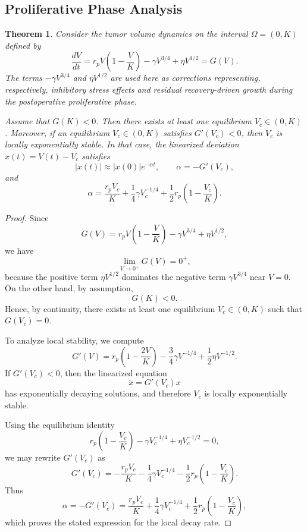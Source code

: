 \documentclass[11pt, reqno]{amsart}
\numberwithin{equation}{section}
\newtheorem{theorem}{Theorem}[section]
\theoremstyle{definition}
\begin{document}
\subsection{Proliferative Phase Analysis}

\begin{theorem}
Consider the tumor volume dynamics on the interval $\Omega=(0,K)$ defined by
\begin{equation}\label{eq:prolif_dynamics}
\frac{dV}{dt}=r_pV\left(1-\frac{V}{K}\right)-\gamma V^{3/4}+\eta V^{1/2}=G(V).
\end{equation}
The terms $-\gamma V^{3/4}$ and $\eta V^{1/2}$ are used here as corrections representing, respectively, inhibitory stress effects and residual recovery-driven growth during the postoperative proliferative phase.

Assume that $G(K)<0$. Then there exists at least one equilibrium $V_c\in(0,K)$. Moreover, if an equilibrium $V_c\in(0,K)$ satisfies $G'(V_c)<0$, then $V_c$ is locally exponentially stable. In that case, the linearized deviation $x(t)=V(t)-V_c$ satisfies
\[
|x(t)|\approx |x(0)|e^{-\alpha t},
\qquad \alpha=-G'(V_c),
\]
and
\[
\alpha=\frac{r_pV_c}{K}+\frac{1}{4}\gamma V_c^{-1/4}
+\frac{1}{2}r_p\left(1-\frac{V_c}{K}\right).
\]
\end{theorem}

\begin{proof}
Since
\[
G(V)=r_pV\left(1-\frac{V}{K}\right)-\gamma V^{3/4}+\eta V^{1/2},
\]
we have
\[
\lim_{V\to0^+}G(V)=0^+,
\]
because the positive term $\eta V^{1/2}$ dominates the negative term $\gamma V^{3/4}$ near $V=0$. On the other hand, by assumption,
\[
G(K)<0.
\]
Hence, by continuity, there exists at least one equilibrium
$V_c\in(0,K)$ such that $G(V_c)=0$.

To analyze local stability, we compute
\[
G'(V)=r_p\left(1-\frac{2V}{K}\right)-\frac{3}{4}\gamma V^{-1/4}
+\frac{1}{2}\eta V^{-1/2}.
\]
If $G'(V_c)<0$, then the linearized equation
\[
\dot{x}=G'(V_c)x
\]
has exponentially decaying solutions, and therefore $V_c$ is locally
exponentially stable.

Using the equilibrium identity
\[
r_p\left(1-\frac{V_c}{K}\right)-\gamma V_c^{-1/4}+\eta V_c^{-1/2}=0,
\]
we may rewrite $G'(V_c)$ as
\[
G'(V_c)
=-\frac{r_pV_c}{K}-\frac{1}{4}\gamma V_c^{-1/4}
-\frac{1}{2}r_p\left(1-\frac{V_c}{K}\right).
\]
Thus
\[
\alpha=-G'(V_c)
=\frac{r_pV_c}{K}+\frac{1}{4}\gamma V_c^{-1/4}
+\frac{1}{2}r_p\left(1-\frac{V_c}{K}\right),
\]
which proves the stated expression for the local decay rate.
\end{proof}
\end{document}
